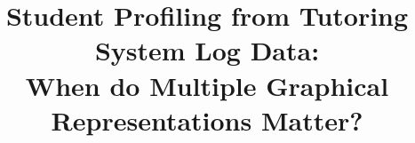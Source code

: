 \documentclass{edm_template}
\begin{document}
\title{Student Profiling from Tutoring System Log Data: \\When do Multiple Graphical Representations Matter?}
%
%
%
%
%
\end{document}

